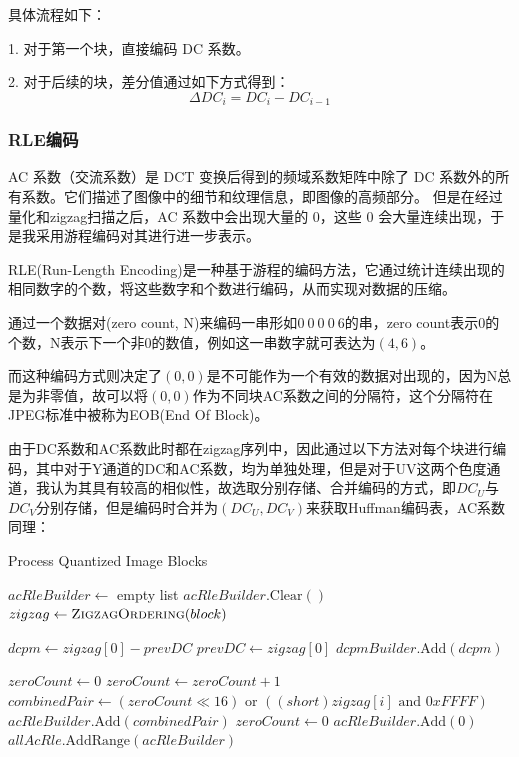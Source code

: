 \documentclass{article}
\begin{document}
具体流程如下：

1. 对于第一个块，直接编码 DC 系数。

2. 对于后续的块，差分值通过如下方式得到：\[\Delta DC_i=DC_i-DC_{i-1}\]

\subsubsection{RLE编码}

AC 系数（交流系数）是 DCT 变换后得到的频域系数矩阵中除了 DC 系数外的所有系数。它们描述了图像中的细节和纹理信息，即图像的高频部分。
但是在经过量化和zigzag扫描之后，AC 系数中会出现大量的 0，这些 0 会大量连续出现，于是我采用游程编码对其进行进一步表示。

RLE(Run-Length Encoding)是一种基于游程的编码方法，它通过统计连续出现的相同数字的个数，将这些数字和个数进行编码，从而实现对数据的压缩。

通过一个数据对(zero count, N)来编码一串形如$0\ 0\ 0\ 0\ 6$的串，zero count表示0的个数，N表示下一个非0的数值，例如这一串数字就可表达为$(4, 6)$。

而这种编码方式则决定了$(0,0)$是不可能作为一个有效的数据对出现的，因为N总是为非零值，故可以将$(0,0)$作为不同块AC系数之间的分隔符，这个分隔符在JPEG标准中被称为EOB(End Of Block)。

由于DC系数和AC系数此时都在zigzag序列中，因此通过以下方法对每个块进行编码，其中对于Y通道的DC和AC系数，均为单独处理，但是对于UV这两个色度通道，我认为其具有较高的相似性，故选取分别存储、合并编码的方式，即$DC_U$与$DC_V$分别存储，但是编码时合并为$(DC_U,DC_V)$来获取Huffman编码表，AC系数同理：
\FloatBarrier
\begin{algorithm}
    \caption{Process Quantized Image Blocks}
    \begin{algorithmic}[1]
        \State $acRleBuilder \gets$ empty list
            \State $acRleBuilder.\text{Clear}()$
            \State $zigzag \gets \Call{ZigzagOrdering}{block}$
            
            \State $dcpm \gets zigzag[0] - prevDC$ 
            \State $prevDC \gets zigzag[0]$
            \State $dcpmBuilder.\text{Add}(dcpm)$
            
            \State $zeroCount \gets 0$ 
              
                    \State $zeroCount \gets zeroCount + 1$
                \Else
                    \State $combinedPair \gets (zeroCount \ll 16) \text{ or } ((short)zigzag[i] \text{ and } 0xFFFF)$
                    \State $acRleBuilder.\text{Add}(combinedPair)$
                    \State $zeroCount \gets 0$ 
                \EndIf
            \EndFor
            \State $acRleBuilder.\text{Add}(0)$ 
            \State $allAcRle.\text{AddRange}(acRleBuilder)$ 
        \EndFor
    \EndProcedure
    \end{algorithmic}
\end{algorithm}
\FloatBarrier
\end{document}
